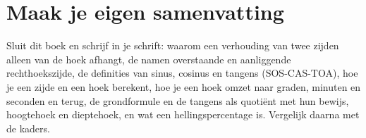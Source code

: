 \begin{oefeningen}

























\end{oefeningen}


\begin{oefeningen}






\end{oefeningen}


\ifzelfstudie
\section*{Maak je eigen samenvatting}
Sluit dit boek en schrijf in je schrift: waarom een verhouding van twee zijden alleen van de hoek afhangt, de namen overstaande en aanliggende rechthoekszijde, de definities van sinus, cosinus en tangens (SOS-CAS-TOA), hoe je een zijde en een hoek berekent, hoe je een hoek omzet naar graden, minuten en seconden en terug, de grondformule en de tangens als quotiënt met hun bewijs, hoogtehoek en dieptehoek, en wat een hellingspercentage is. Vergelijk daarna met de kaders.
\fi
